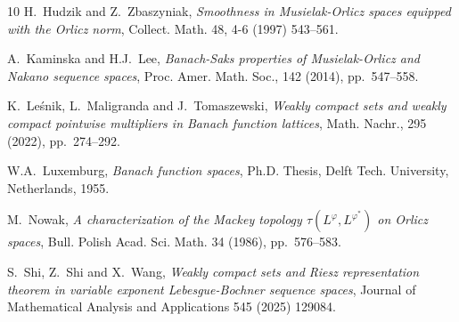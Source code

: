 \documentclass[11pt,a4paper]{amsart}
\begin{document}
\begin{thebibliography}{10}
{\sc H.~Hudzik and Z.~Zbaszyniak}, {\em Smoothness in Musielak-Orlicz spaces equipped with the Orlicz norm}, Collect. Math. 48, 4-6 (1997) 543–561.


{\sc A.~Kaminska and H.J.~Lee}, {\em Banach-{S}aks properties of {M}usielak-{O}rlicz  and {N}akano sequence spaces}, Proc. Amer. Math. Soc., 142 (2014), pp.~547--558.

{\sc K.~Le\'{s}nik, L.~Maligranda and J.~Tomaszewski}, {\em Weakly compact sets and weakly compact pointwise multipliers in Banach function lattices}, Math. Nachr., 295 (2022), pp.~274--292.

{\sc W.A.~Luxemburg}, {\em Banach function spaces}, Ph.D. Thesis, Delft Tech. University, Netherlands, 1955.


{\sc M.~Nowak}, {\em A characterization of the {M}ackey topology $\tau(L^{\varphi}, L^{\varphi^*})$ on {O}rlicz spaces}, Bull. Polish Acad. Sci. Math. 34 (1986), pp.~576--583.


{\sc S.~Shi, Z.~Shi and X.~Wang}, {\em Weakly compact sets and Riesz representation theorem in variable exponent Lebesgue-Bochner sequence spaces}, Journal of Mathematical Analysis and Applications 545 (2025) 129084. %

\end{thebibliography}
\end{document}
